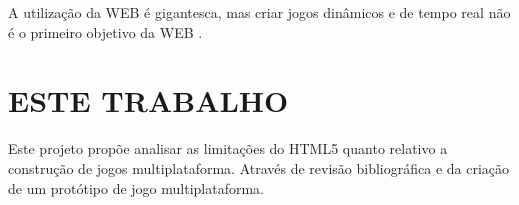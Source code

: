 \begin{draft}
A utilização da WEB é gigantesca, mas criar jogos
dinâmicos e de tempo real não é o primeiro objetivo da WEB
\autocite{html5mostwanted}.

\section{ESTE TRABALHO}

Este projeto propõe analisar as limitações do HTML5 quanto relativo
a construção de jogos multiplataforma. Através de revisão
bibliográfica e da criação de um protótipo de jogo multiplataforma.



\end{draft}
